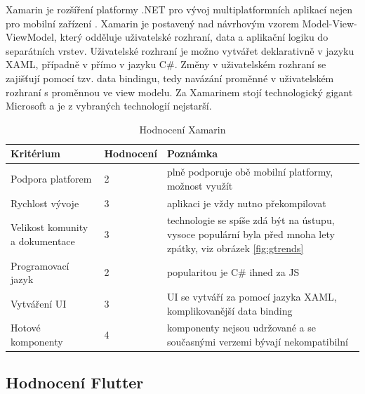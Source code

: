 Xamarin je rozšíření platformy .NET pro vývoj multiplatformních aplikací nejen pro mobilní zařízení \cite{microsoftXamarin}. Xamarin je postavený nad návrhovým vzorem Model-View-ViewModel, který odděluje uživatelské rozhraní, data a aplikační logiku do separátních vrstev. Uživatelské rozhraní je možno vytvářet deklarativně v jazyku XAML, případně v přímo v jazyku C\#. Změny v uživatelském rozhraní se zajišťují pomocí tzv. data bindingu, tedy navázání proměnné v uživatelském rozhraní s proměnnou ve view modelu. Za Xamarinem stojí technologický gigant Microsoft a je z vybraných technologií nejstarší.

\begin{table}[H]
	\begin{tabularx}{\textwidth}{| X | X | X |}
		\hline
		Kritérium                       & Hodnocení & Poznámka \\
		\hline
		Podpora platforem & 2 & plně podporuje obě mobilní platformy, možnost využít         \\
		\hline
		Rychlost vývoje                 & 3 & aplikaci je vždy nutno překompilovat         \\
		\hline
		Velikost komunity a dokumentace & 3 & technologie se spíše zdá být na ústupu, vysoce populární byla před mnoha lety zpátky, viz obrázek \ref{fig:gtrends}         \\
		\hline
		Programovací jazyk              & 2 & popularitou je C\# ihned za JS \cite{novick2017react}         \\
		\hline
		Vytváření UI                    & 3 & UI se vytváří za pomocí jazyka XAML, komplikovanější data binding         \\
		\hline
		Hotové komponenty               & 4 & komponenty nejsou udržované a se současnými verzemi bývají nekompatibilní \\
		\hline
	\end{tabularx}
	\caption{Hodnocení Xamarin}
\end{table}

\subsection{Hodnocení Flutter}



